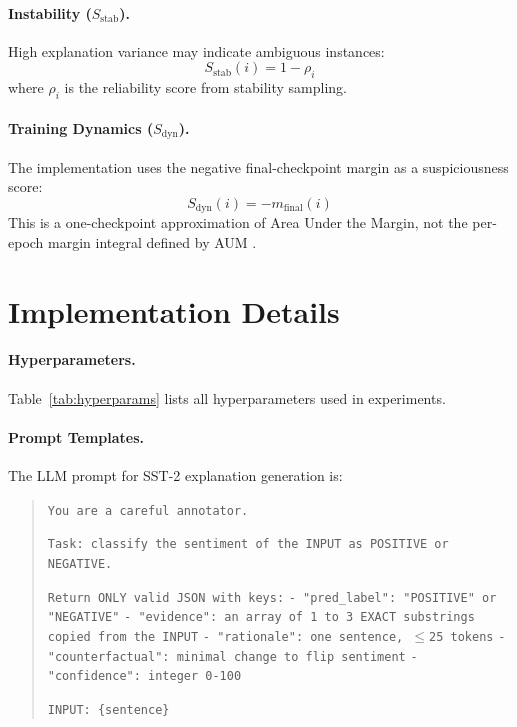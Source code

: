 \documentclass[letterpaper]{article}
\newcommand{\Sstab}{S_{\text{stab}}}
\newcommand{\Sdyn}{S_{\text{dyn}}}
\begin{document}
\paragraph{Instability ($\Sstab$).}
High explanation variance may indicate ambiguous instances:
\begin{equation}
    \Sstab(i) = 1 - \rho_i
\end{equation}
where $\rho_i$ is the reliability score from stability sampling.

\paragraph{Training Dynamics ($\Sdyn$).}
The implementation uses the negative final-checkpoint margin as a suspiciousness score:
\begin{equation}
    \Sdyn(i) = -m_{\mathrm{final}}(i)
\end{equation}
This is a one-checkpoint approximation of Area Under the Margin, not the per-epoch margin integral defined by AUM \citep{pleiss2020identifying}.

\section{Implementation Details}
\label{sec:appendix}

\paragraph{Hyperparameters.}
Table~\ref{tab:hyperparams} lists all hyperparameters used in experiments.

\paragraph{Prompt Templates.}
The LLM prompt for SST-2 explanation generation is:

\begin{quote}
\small
\texttt{You are a careful annotator.}

\texttt{Task: classify the sentiment of the INPUT as POSITIVE or NEGATIVE.}

\texttt{Return ONLY valid JSON with keys:}
\texttt{- "pred\_label": "POSITIVE" or "NEGATIVE"}
\texttt{- "evidence": an array of 1 to 3 EXACT substrings copied from the INPUT}
\texttt{- "rationale": one sentence, $\leq$25 tokens}
\texttt{- "counterfactual": minimal change to flip sentiment}
\texttt{- "confidence": integer 0-100}

\texttt{INPUT: \{sentence\}}
\end{quote}
\end{document}

